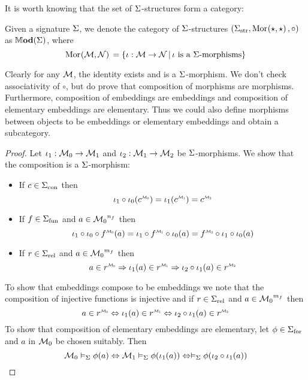 It is worth knowing that the set of $\Sigma$-structures form a category:
\begin{dfn}
    Given a signature $\Sigma$, 
    we denote the category of $\Sigma$-structures 
    $({\Sigma}_\mathrm{str}, \mathrm{Mor}_{}(\star, \star)\,, \circ)$
    as $\mathbb{M} \mathbf{od}(\Sigma)$,
    where \[\mathrm{Mor}_{}(\mathcal{M}, \mathcal{N})\, = 
    \left\{\iota : {\mathcal{M}} \to {\mathcal{N}} \,|\, 
    \iota \text{ is a } \Sigma\text{-morphisms}\right\}\]
    
    Clearly for any $\mathcal{M}$, 
    the identity exists and is a $\Sigma$-morphism.
    We don't check associativity of $\circ$,
    but do prove that composition of morphisms are morphisms.
    Furthermore, composition of embeddings are embeddings
    and composition of elementary embeddings are elementary.
    Thus we could also define morphisms between objects to be embeddings
    or elementary embeddings and obtain a subcategory.
\end{dfn}
\begin{proof}
    Let $\iota_1 : \mathcal{M}_0 \to \mathcal{M}_1$ and 
    $\iota_2 : \mathcal{M}_1 \to \mathcal{M}_2$ be $\Sigma$-morphisms.
    We show that the composition is a $\Sigma$-morphism:
    \begin{itemize}
        \item If $c \in {\Sigma}_\mathrm{con}$ then 
            \[
                \io_1 \circ \io_0 (\modintp{\MM_0}{c}) = 
                \io_1 (\modintp{\MM_1}{c}) = \modintp{\MM_2}{c}
            \]
        \item If $f \in {\Sigma}_\mathrm{fun}$ and 
            $a \in {\mathcal{M}_0}^{n_f}$ then
            \[
                \io_1 \circ \io_0 \circ \modintp{\MM_0}{f}(a) = 
                \io_1 \circ \modintp{\MM_1}{f} \circ \io_0 (a) = 
                \modintp{\MM_2}{f} \circ \io_1 \circ \io_0 (a)
            \]
        \item If $r \in {\Sigma}_\mathrm{rel}$ and 
            $a \in {\mathcal{M}_0}^{m_f}$ then
            \[
                a \in \modintp{\MM_0}{r} \implies \io_1 (a) \in \modintp{\MM_1}{r} 
                \implies \io_2 \circ \io_1 (a) \in \modintp{\MM_2}{r}
            \]
    \end{itemize}
    To show that embeddings compose to be embeddings we note that 
    the composition of injective functions is injective 
    and if $r \in {\Sigma}_\mathrm{rel}$ and 
    $a \in {\mathcal{M}_0}^{m_f}$ then
    \[
        a \in \modintp{\MM_0}{r} \iff \io_1 (a) \in \modintp{\MM_1}{r} 
        \iff \io_2 \circ \io_1 (a) \in \modintp{\MM_2}{r}
    \]
    To show that composition of elementary embeddings are elementary,
    let $\phi \in {\Sigma}_\mathrm{for}$ and $a$ in ${\mathcal{M}_0}$ be chosen suitably.
    Then
    \[
        \mathcal{M}_0 \vDash_{\Sigma} \phi(a) \Leftrightarrow \mathcal{M}_1 \vDash_{\Sigma} \phi(\iota_1 (a))
        \Leftrightarrow \vDash_{\Sigma} \phi(\iota_2 \circ \iota_1 (a))
    \]
\end{proof}

